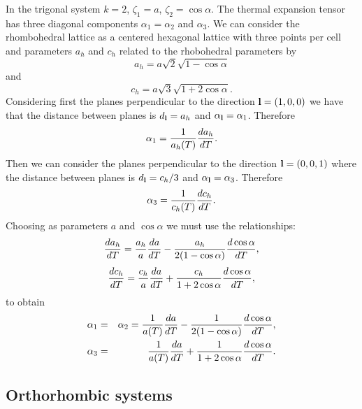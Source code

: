 \documentclass[12pt,a4paper,twoside]{report}
\begin{document}
In the trigonal system $k=2$, $\zeta_1=a$, $\zeta_2=\cos\alpha$. 
The thermal expansion tensor has three diagonal components 
$\alpha_1=\alpha_2$ and $\alpha_3$. We can consider the rhombohedral
lattice as a centered hexagonal lattice with three points per cell
and parameters $a_h$ and $c_h$ related to the rhobohedral parameters
by
\begin{equation}
a_h= a \sqrt{2} \sqrt{1-\cos\alpha}
\end{equation}
and 
\begin{equation}
c_h= a \sqrt{3} \sqrt{1+2\cos\alpha}.
\end{equation}
Considering first the planes perpendicular to the direction
${\bf l}=(1,0,0)$ we have that the distance between planes is
$d_{\bf l}=a_h$ and $\alpha_{\bf l}=\alpha_1$. Therefore
\begin{equation}
\alpha_1 = {1\over a_h(T)} {d a_h \over dT}.
\end{equation}
Then we can consider the planes perpendicular to the direction
${\bf l}=(0,0,1)$ where the distance between planes is
$d_{\bf l}=c_h/3$ and $\alpha_{\bf l}=\alpha_3$. Therefore
\begin{equation}
\alpha_3 = {1\over c_h(T)} {dc_h \over d T}.
\end{equation}
Choosing as parameters $a$ and $\cos \alpha$ we must use the relationships:
\begin{equation}
{d a_h \over d T}= {a_h \over a} {d a \over d T} - {a_h \over 2(1-\cos\alpha)}{d \cos\alpha \over d T},
\end{equation}
\begin{equation}
{d c_h \over d T}= {c_h \over a} {d a \over d T} + {c_h \over 1+2\cos\alpha}{d \cos\alpha \over d T},
\end{equation}
to obtain
\begin{eqnarray}
\alpha_1 &=& \alpha_2= {1\over a(T)} {d a \over dT} - {1 \over 2(1-\cos\alpha)}{d \cos\alpha \over d T}, \\
\alpha_3 &=& {1\over a(T)} {d a \over dT} + {1 \over 1+2\cos\alpha}
{d \cos\alpha \over d T}.
\end{eqnarray}

{\color{web-blue}\subsection{Orthorhombic systems}}
\color{black}
\end{document}
